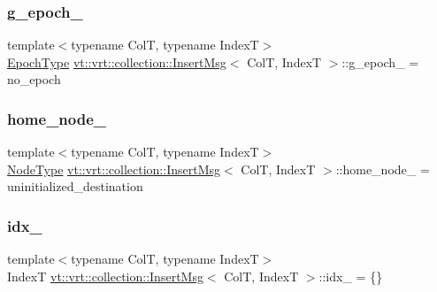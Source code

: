 \subsubsection{\texorpdfstring{g\+\_\+epoch\+\_\+}{g\_epoch\_}}
{\footnotesize\ttfamily template$<$typename ColT, typename IndexT$>$ \\
\hyperlink{namespacevt_a985a5adf291c34a3ca263b3378388236}{Epoch\+Type} \hyperlink{structvt_1_1vrt_1_1collection_1_1_insert_msg}{vt\+::vrt\+::collection\+::\+Insert\+Msg}$<$ ColT, IndexT $>$\+::g\+\_\+epoch\+\_\+ = no\+\_\+epoch}

\mbox{\label{structvt_1_1vrt_1_1collection_1_1_insert_msg_a0ab2ebbf58c63307eb4b7e0794cd60d8}} 
\subsubsection{\texorpdfstring{home\+\_\+node\+\_\+}{home\_node\_}}
{\footnotesize\ttfamily template$<$typename ColT, typename IndexT$>$ \\
\hyperlink{namespacevt_a866da9d0efc19c0a1ce79e9e492f47e2}{Node\+Type} \hyperlink{structvt_1_1vrt_1_1collection_1_1_insert_msg}{vt\+::vrt\+::collection\+::\+Insert\+Msg}$<$ ColT, IndexT $>$\+::home\+\_\+node\+\_\+ = uninitialized\+\_\+destination}

\mbox{\label{structvt_1_1vrt_1_1collection_1_1_insert_msg_a34ee4c02fcf0ae389eb0f11a44033ccc}} 
\subsubsection{\texorpdfstring{idx\+\_\+}{idx\_}}
{\footnotesize\ttfamily template$<$typename ColT, typename IndexT$>$ \\
IndexT \hyperlink{structvt_1_1vrt_1_1collection_1_1_insert_msg}{vt\+::vrt\+::collection\+::\+Insert\+Msg}$<$ ColT, IndexT $>$\+::idx\+\_\+ = \{\}}


